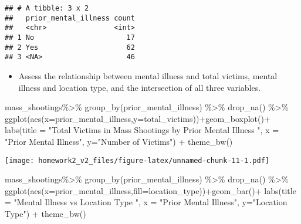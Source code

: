 \documentclass[
]{article}
\newenvironment{Shaded}{\begin{snugshade}}{\end{snugshade}}
\newcommand{\AttributeTok}[1]{\textcolor[rgb]{0.77,0.63,0.00}{#1}}
\newcommand{\FunctionTok}[1]{\textcolor[rgb]{0.00,0.00,0.00}{#1}}
\newcommand{\NormalTok}[1]{#1}
\newcommand{\SpecialCharTok}[1]{\textcolor[rgb]{0.00,0.00,0.00}{#1}}
\newcommand{\StringTok}[1]{\textcolor[rgb]{0.31,0.60,0.02}{#1}}
\providecommand{\tightlist}{%
  \setlength{\itemsep}{0pt}\setlength{\parskip}{0pt}}
\begin{document}
\begin{verbatim}
## # A tibble: 3 x 2
##   prior_mental_illness count
##   <chr>                <int>
## 1 No                      17
## 2 Yes                     62
## 3 <NA>                    46
\end{verbatim}

\begin{itemize}
\tightlist
\item
  Assess the relationship between mental illness and total victims,
  mental illness and location type, and the intersection of all three
  variables.
\end{itemize}

\begin{Shaded}
\begin{Highlighting}[]
\NormalTok{mass\_shootings}\SpecialCharTok{\%\textgreater{}\%} 
 \FunctionTok{group\_by}\NormalTok{(prior\_mental\_illness) }\SpecialCharTok{\%\textgreater{}\%} 
  \FunctionTok{drop\_na}\NormalTok{() }\SpecialCharTok{\%\textgreater{}\%} 
  \FunctionTok{ggplot}\NormalTok{(}\FunctionTok{aes}\NormalTok{(}\AttributeTok{x=}\NormalTok{prior\_mental\_illness,}\AttributeTok{y=}\NormalTok{total\_victims))}\SpecialCharTok{+}\FunctionTok{geom\_boxplot}\NormalTok{()}\SpecialCharTok{+}
\FunctionTok{labs}\NormalTok{(}\AttributeTok{title =} \StringTok{"Total Victims in Mass Shootings by Prior Mental Illness "}\NormalTok{,}
       \AttributeTok{x =} \StringTok{"Prior Mental Illness"}\NormalTok{, }\AttributeTok{y=}\StringTok{"Number of Victims"}\NormalTok{) }\SpecialCharTok{+}
  \FunctionTok{theme\_bw}\NormalTok{()}
\end{Highlighting}
\end{Shaded}

\texttt{[image: homework2\_v2\_files/figure-latex/unnamed-chunk-11-1.pdf]}

\begin{Shaded}
\begin{Highlighting}[]
\NormalTok{mass\_shootings}\SpecialCharTok{\%\textgreater{}\%} 
 \FunctionTok{group\_by}\NormalTok{(prior\_mental\_illness) }\SpecialCharTok{\%\textgreater{}\%} 
  \FunctionTok{drop\_na}\NormalTok{() }\SpecialCharTok{\%\textgreater{}\%} 
  \FunctionTok{ggplot}\NormalTok{(}\FunctionTok{aes}\NormalTok{(}\AttributeTok{x=}\NormalTok{prior\_mental\_illness,}\AttributeTok{fill=}\NormalTok{location\_type))}\SpecialCharTok{+}\FunctionTok{geom\_bar}\NormalTok{()}\SpecialCharTok{+}
\FunctionTok{labs}\NormalTok{(}\AttributeTok{title =} \StringTok{"Mental Illness vs Location Type "}\NormalTok{,}
       \AttributeTok{x =} \StringTok{"Prior Mental Illness"}\NormalTok{, }\AttributeTok{y=}\StringTok{"Location Type"}\NormalTok{) }\SpecialCharTok{+}
  \FunctionTok{theme\_bw}\NormalTok{()}
\end{Highlighting}
\end{Shaded}
\end{document}
